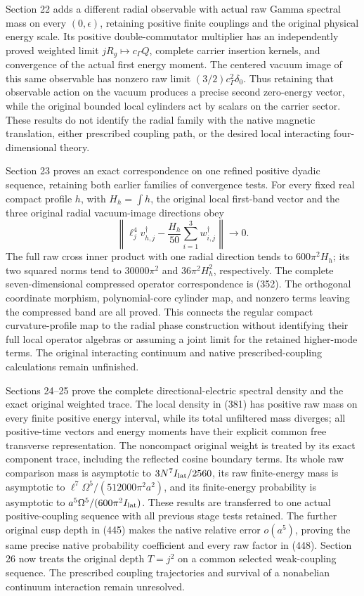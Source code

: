 \documentclass[
  11pt,
]{article}
\begin{document}
Section 22 adds a different radial observable with actual raw Gamma
spectral mass on every \((0,\epsilon)\), retaining positive finite
couplings and the original physical energy scale. Its positive
double-commutator multiplier has an independently proved weighted limit
\(jR_g\mapsto c_\Gamma Q\), complete carrier insertion kernels, and
convergence of the actual first energy moment. The centered vacuum image
of this same observable has nonzero raw limit
\((3/2)c_\Gamma^2\delta_0\). Thus retaining that observable action on
the vacuum produces a precise second zero-energy vector, while the
original bounded local cylinders act by scalars on the carrier sector.
These results do not identify the radial family with the native magnetic
translation, either prescribed coupling path, or the desired local
interacting four-dimensional theory.

Section 23 proves an exact correspondence on one refined positive dyadic
sequence, retaining both earlier families of convergence tests. For
every fixed real compact profile \(h\), with \(H_h=\int h\), the
original local first-band vector and the three original radial
vacuum-image directions obey \[
 \left\|\ell_j^4v_{h,j}^{\dagger}
       -\frac{H_h}{50}\sum_{i=1}^3w_{i,j}^{\dagger}\right\|\to0.
\] The full raw cross inner product with one radial direction tends to
\(600\pi^2H_h\); its two squared norms tend to \(30000\pi^2\) and
\(36\pi^2H_h^2\), respectively. The complete seven-dimensional
compressed operator correspondence is (352). The orthogonal coordinate
morphism, polynomial-core cylinder map, and nonzero terms leaving the
compressed band are all proved. This connects the regular compact
curvature-profile map to the radial phase construction without
identifying their full local operator algebras or assuming a joint limit
for the retained higher-mode terms. The original interacting continuum
and native prescribed-coupling calculations remain unfinished.

Sections 24--25 prove the complete directional-electric spectral density
and the exact original weighted trace. The local density in (381) has
positive raw mass on every finite positive energy interval, while its
total unfiltered mass diverges; all positive-time vectors and energy
moments have their explicit common free transverse representation. The
noncompact original weight is treated by its exact component trace,
including the reflected cosine boundary terms. Its whole raw comparison
mass is asymptotic to \(3N^7I_{\rm lat}/2560\), its raw finite-energy
mass is asymptotic to \(\ell^7\Omega^5/(512000\pi^2a^2)\), and its
finite-energy probability is asymptotic to
\(a^5\Omega^5/(600\pi^2I_{\rm lat})\). These results are transferred to
one actual positive-coupling sequence with all previous stage tests
retained. The further original cusp depth in (445) makes the native
relative error \(o(a^5)\), proving the same precise native probability
coefficient and every raw factor in (448). Section 26 now treats the
original depth \(T=j^2\) on a common selected weak-coupling sequence.
The prescribed coupling trajectories and survival of a nonabelian
continuum interaction remain unresolved.
\end{document}
